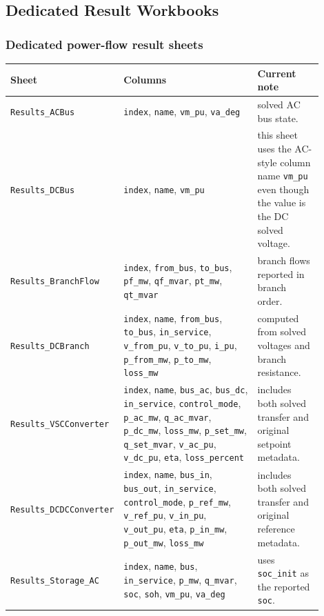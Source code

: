 \subsection{Dedicated Result Workbooks}

\subsubsection*{Dedicated power-flow result sheets}

\begin{longtable}{L{0.20\linewidth}L{0.48\linewidth}L{0.22\linewidth}}
\toprule
Sheet & Columns & Current note \\
\midrule
\endhead
\texttt{Results\_ACBus} & \texttt{index}, \texttt{name}, \texttt{vm\_pu}, \texttt{va\_deg} & solved AC bus state. \\
\texttt{Results\_DCBus} & \texttt{index}, \texttt{name}, \texttt{vm\_pu} & this sheet uses the AC-style column name \texttt{vm\_pu} even though the value is the DC solved voltage. \\
\texttt{Results\_BranchFlow} & \texttt{index}, \texttt{from\_bus}, \texttt{to\_bus}, \texttt{pf\_mw}, \texttt{qf\_mvar}, \texttt{pt\_mw}, \texttt{qt\_mvar} & branch flows reported in branch order. \\
\texttt{Results\_DCBranch} & \texttt{index}, \texttt{name}, \texttt{from\_bus}, \texttt{to\_bus}, \texttt{in\_service}, \texttt{v\_from\_pu}, \texttt{v\_to\_pu}, \texttt{i\_pu}, \texttt{p\_from\_mw}, \texttt{p\_to\_mw}, \texttt{loss\_mw} & computed from solved voltages and branch resistance. \\
\texttt{Results\_VSCConverter} & \texttt{index}, \texttt{name}, \texttt{bus\_ac}, \texttt{bus\_dc}, \texttt{in\_service}, \texttt{control\_mode}, \texttt{p\_ac\_mw}, \texttt{q\_ac\_mvar}, \texttt{p\_dc\_mw}, \texttt{loss\_mw}, \texttt{p\_set\_mw}, \texttt{q\_set\_mvar}, \texttt{v\_ac\_pu}, \texttt{v\_dc\_pu}, \texttt{eta}, \texttt{loss\_percent} & includes both solved transfer and original setpoint metadata. \\
\texttt{Results\_DCDCConverter} & \texttt{index}, \texttt{name}, \texttt{bus\_in}, \texttt{bus\_out}, \texttt{in\_service}, \texttt{control\_mode}, \texttt{p\_ref\_mw}, \texttt{v\_ref\_pu}, \texttt{v\_in\_pu}, \texttt{v\_out\_pu}, \texttt{eta}, \texttt{p\_in\_mw}, \texttt{p\_out\_mw}, \texttt{loss\_mw} & includes both solved transfer and original reference metadata. \\
\texttt{Results\_Storage\_AC} & \texttt{index}, \texttt{name}, \texttt{bus}, \texttt{in\_service}, \texttt{p\_mw}, \texttt{q\_mvar}, \texttt{soc}, \texttt{soh}, \texttt{vm\_pu}, \texttt{va\_deg} & uses \texttt{soc\_init} as the reported \texttt{soc}. \\

\end{longtable}
